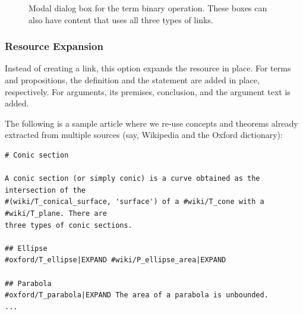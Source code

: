 \documentclass[a4paper]{article}
\begin{document}
\begin{figure}[ht]
\begin{center}
\caption{Modal dialog box for the term binary operation. These boxes can also have content that uses all three types of links. }
\label{modal}
\end{center}
\end{figure}

\subsubsection{Resource Expansion}

Instead of creating a link, this option expands the resource in place. For terms and propositions, the definition and the statement are added in place, respectively. For arguments, its premises, conclusion, and the argument text is added.

The following is a sample article where we re-use concepts and theorems already extracted from multiple sources (say, Wikipedia and the Oxford dictionary):

\begin{verbatim}
# Conic section

A conic section (or simply conic) is a curve obtained as the intersection of the
#(wiki/T_conical_surface, 'surface') of a #wiki/T_cone with a #wiki/T_plane. There are
three types of conic sections.

## Ellipse
#oxford/T_ellipse|EXPAND #wiki/P_ellipse_area|EXPAND

## Parabola
#oxford/T_parabola|EXPAND The area of a parabola is unbounded.
...
\end{verbatim}
\end{document}
